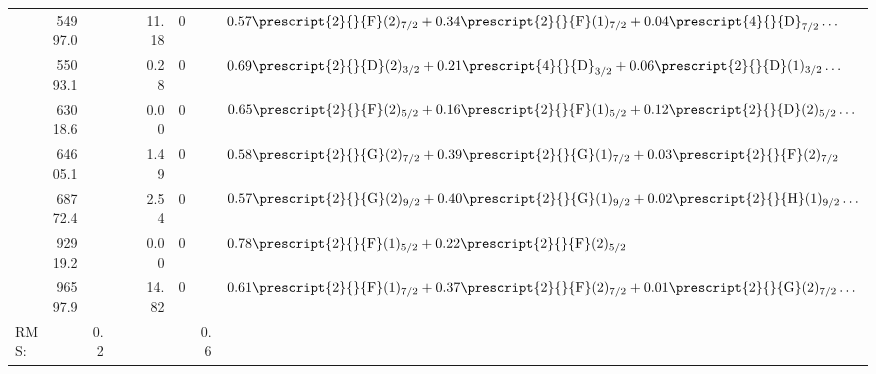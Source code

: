 \begin{tabular}{|rrr|rrrrr|l|}
   & 54997.0 &  &  &  & 11.18 & 0 &  &
  $0.57 \prescript{2}{}{\mathrm{F}}(2)_{7/2} + 0.34 \prescript{2}{}{\mathrm{F}}(1)_{7/2} + 0.04 \prescript{4}{}{\mathrm{D}}_{7/2} \ldots$ \\
   & 55093.1 &  &  &  & 0.28 & 0 &  &
  $0.69 \prescript{2}{}{\mathrm{D}}(2)_{3/2} + 0.21 \prescript{4}{}{\mathrm{D}}_{3/2} + 0.06 \prescript{2}{}{\mathrm{D}}(1)_{3/2} \ldots$ \\
   & 63018.6 &  &  &  & 0.00 & 0 &  &
  $0.65 \prescript{2}{}{\mathrm{F}}(2)_{5/2} + 0.16 \prescript{2}{}{\mathrm{F}}(1)_{5/2} + 0.12 \prescript{2}{}{\mathrm{D}}(2)_{5/2} \ldots$ \\
   & 64605.1 &  &  &  & 1.49 & 0 &  &
  $0.58 \prescript{2}{}{\mathrm{G}}(2)_{7/2} + 0.39 \prescript{2}{}{\mathrm{G}}(1)_{7/2} + 0.03 \prescript{2}{}{\mathrm{F}}(2)_{7/2}$ \\
   & 68772.4 &  &  &  & 2.54 & 0 &  &
  $0.57 \prescript{2}{}{\mathrm{G}}(2)_{9/2} + 0.40 \prescript{2}{}{\mathrm{G}}(1)_{9/2} + 0.02 \prescript{2}{}{\mathrm{H}}(1)_{9/2} \ldots$ \\
   & 92919.2 &  &  &  & 0.00 & 0 &  &
  $0.78 \prescript{2}{}{\mathrm{F}}(1)_{5/2} + 0.22 \prescript{2}{}{\mathrm{F}}(2)_{5/2}$ \\
   & 96597.9 &  &  &  & 14.82 & 0 &  &
  $0.61 \prescript{2}{}{\mathrm{F}}(1)_{7/2} + 0.37 \prescript{2}{}{\mathrm{F}}(2)_{7/2} + 0.01 \prescript{2}{}{\mathrm{G}}(2)_{7/2} \ldots$ \\
  \hline
  \multicolumn{1}{|l}{RMS:} & & 0.2 & & & & & 0.6 & \\
  \hline
\end{tabular}